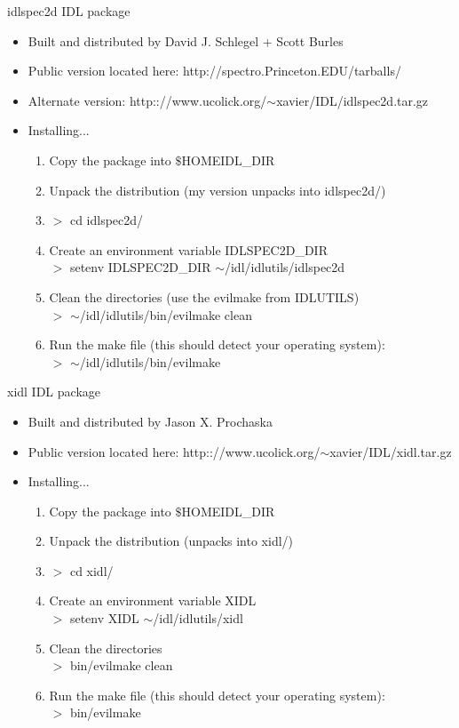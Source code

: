 \documentclass[11pt,letterpaper,dvips]{article}
\begin{document}
\begin{enumerate}
{\Large   \item idlspec2d IDL package}
   \begin{itemize}
	\item Built and distributed by David J. Schlegel + Scott Burles
	\item Public version located here: 
	http://spectro.Princeton.EDU/tarballs/
	\item Alternate version: 
	http:://www.ucolick.org/$\sim$xavier/IDL/idlspec2d.tar.gz
	\item Installing...
	\begin{enumerate}
	  \item Copy the package into $\$$HOMEIDL\_DIR
	  \item Unpack the distribution (my version unpacks into idlspec2d/)
	  \item $>$ cd idlspec2d/
	  \item Create an environment variable IDLSPEC2D\_DIR\\
	  $>$ setenv IDLSPEC2D\_DIR $\sim$/idl/idlutils/idlspec2d
	  \item Clean the directories (use the evilmake from IDLUTILS) \\
	  $>$ $\sim$/idl/idlutils/bin/evilmake clean
	  \item Run the make file (this should detect your operating system):  \\
	  $>$ $\sim$/idl/idlutils/bin/evilmake  
	\end{enumerate}
   \end{itemize}

{\Large   \item xidl IDL package}
   \begin{itemize}
	\item Built and distributed by Jason X. Prochaska
	\item Public version located here:  
	http:://www.ucolick.org/$\sim$xavier/IDL/xidl.tar.gz
	\item Installing...
	\begin{enumerate}
	  \item Copy the package into $\$$HOMEIDL\_DIR
	  \item Unpack the distribution (unpacks into xidl/)
	  \item $>$ cd xidl/
	  \item Create an environment variable XIDL\\
	  $>$ setenv XIDL $\sim$/idl/idlutils/xidl
	  \item Clean the directories \\
	  $>$ bin/evilmake clean
	  \item Run the make file (this should detect your operating system):  \\
	  $>$ bin/evilmake
	\end{enumerate}
   \end{itemize}


\end{enumerate}
\end{document}
